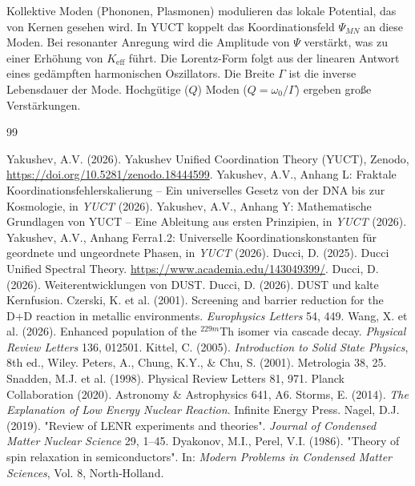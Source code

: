 \documentclass[12pt]{article}
\theoremstyle{remark}
\newcommand{\Keff}{K_{\mathrm{eff}}}
\begin{document}
	Kollektive Moden (Phononen, Plasmonen) modulieren das lokale Potential, das von Kernen gesehen wird. In YUCT koppelt das Koordinationsfeld \(\Psi_{MN}\) an diese Moden. Bei resonanter Anregung wird die Amplitude von \(\Psi\) verstärkt, was zu einer Erhöhung von \(\Keff\) führt. Die Lorentz-Form folgt aus der linearen Antwort eines gedämpften harmonischen Oszillators. Die Breite \(\Gamma\) ist die inverse Lebensdauer der Mode. Hochgütige (\(Q\)) Moden (\(Q = \omega_0/\Gamma\)) ergeben große Verstärkungen.
	
	\begin{thebibliography}{99}
		
		 Yakushev, A.V. (2026). Yakushev Unified Coordination Theory (YUCT), Zenodo, \url{https://doi.org/10.5281/zenodo.18444599}.
		 Yakushev, A.V., Anhang L: Fraktale Koordinationsfehlerskalierung – Ein universelles Gesetz von der DNA bis zur Kosmologie, in \emph{YUCT} (2026).
		 Yakushev, A.V., Anhang Y: Mathematische Grundlagen von YUCT – Eine Ableitung aus ersten Prinzipien, in \emph{YUCT} (2026).
		 Yakushev, A.V., Anhang Ferra1.2: Universelle Koordinationskonstanten für geordnete und ungeordnete Phasen, in \emph{YUCT} (2026).
		 Ducci, D. (2025). Ducci Unified Spectral Theory. \url{https://www.academia.edu/143049399/}.
		 Ducci, D. (2026). Weiterentwicklungen von DUST.
		 Ducci, D. (2026). DUST und kalte Kernfusion.
		 Czerski, K. et al. (2001). Screening and barrier reduction for the D+D reaction in metallic environments. \textit{Europhysics Letters} 54, 449.
		 Wang, X. et al. (2026). Enhanced population of the \(^{229m}\)Th isomer via cascade decay. \textit{Physical Review Letters} 136, 012501.
		 Kittel, C. (2005). \textit{Introduction to Solid State Physics}, 8th ed., Wiley.
		 Peters, A., Chung, K.Y., \& Chu, S. (2001). Metrologia 38, 25.
		 Snadden, M.J. et al. (1998). Physical Review Letters 81, 971.
		 Planck Collaboration (2020). Astronomy \& Astrophysics 641, A6.
		 Storms, E. (2014). \textit{The Explanation of Low Energy Nuclear Reaction}. Infinite Energy Press.
		 Nagel, D.J. (2019). "Review of LENR experiments and theories". \textit{Journal of Condensed Matter Nuclear Science} 29, 1–45.
		 Dyakonov, M.I., Perel, V.I. (1986). "Theory of spin relaxation in semiconductors". In: \textit{Modern Problems in Condensed Matter Sciences}, Vol. 8, North‑Holland.

\end{thebibliography}
\end{document}
